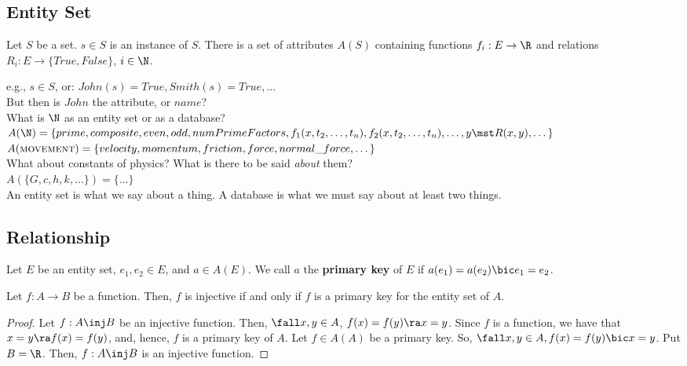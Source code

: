 \documentclass[12pt]{article}
\begin{document}
    \subsection{Entity Set}
    Let $S$ be a set. $s \in S$ is an instance of $S$. There is a set of attributes $A(S)$ containing functions $f_i:E \to \R$ and relations $R_i:E \to \{True, False\}$, $i \in \N$. 

    e.g., $s \in S$,
    or: $John(s) = True, Smith(s) = True,\dots$ \\
    But then is $John$ the attribute, or $name$? \\

    What is $\N$ as an entity set or as a database? \\
    $A(\N) = \{prime, composite, even, odd, numPrimeFactors,f_1(x,t_2,\dots,t_n), \\
    f_2(x,t_2,\dots,t_n), \dots, y \mst R(x,y),\dots\}$ \\

    $A(\textsc{movement}) = \{velocity, momentum, friction, force, normal\_force,\dots\}$ \\

    What about constants of physics? What is there to be said \textit{about} them? \\
    $A(\{G, c, h, k, \dots\}) = \{\dots\}$ \\

    An entity set is what we say about a thing. A database is what we must say about at least two things. 

    \subsection{Relationship}
    \begin{definition}
        Let $E$ be an entity set, $e_1, e_2 \in E$, and $a \in A(E)$. We call $a$ the \textbf{primary key} of $E$ if $a(e_1) = a(e_2) \bic e_1 = e_2$. 
    \end{definition}

    \begin{theorem}
        Let $f:A \to B$ be a function. Then, $f$ is injective if and only if $f$ is a primary key for the entity set of $A$. 
    \end{theorem}
    \begin{proof}
        Let $f:A \inj B$ be an injective function. Then, $\fall x,y \in A$, $f(x) = f(y) \ra x = y$. Since $f$ is a function, we have that $x = y \ra f(x) = f(y)$, and, hence, $f$ is a primary key of $A$. \p
        Let $f \in A(A)$ be a primary key. So, $\fall x,y \in A, f(x) = f(y) \bic x = y$. Put $B = \R$. Then, $f:A \inj B$ is an injective function. 
    \end{proof}
\end{document}
